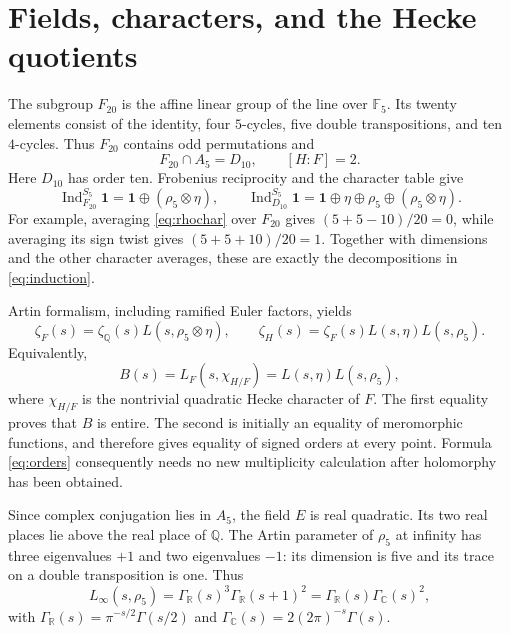 \documentclass[11pt]{article}
\theoremstyle{definition}
\theoremstyle{remark}
\newcommand{\Q}{\mathbb Q}
\newcommand{\R}{\mathbb R}
\newcommand{\C}{\mathbb C}
\newcommand{\Ind}{\operatorname{Ind}}
\newcommand{\Gr}{\Gamma_{\R}}
\newcommand{\Gc}{\Gamma_{\C}}
\newcommand{\one}{\mathbf 1}
\newcommand{\rh}{\rho_5}
\numberwithin{equation}{section}
\begin{document}
\section{Fields, characters, and the Hecke quotients}

The subgroup $F_{20}$ is the affine linear group of the line over $\mathbb F_5$. Its twenty elements consist of the identity, four $5$-cycles, five double transpositions, and ten $4$-cycles. Thus $F_{20}$ contains odd permutations and
\[
F_{20}\cap A_5=D_{10},\qquad [H:F]=2.
\]
Here $D_{10}$ has order ten. Frobenius reciprocity and the character table give
\begin{equation}\label{eq:induction}
\Ind_{F_{20}}^{S_5}\one=\one\oplus(\rh\otimes\eta),
\qquad
\Ind_{D_{10}}^{S_5}\one
=\one\oplus\eta\oplus\rh\oplus(\rh\otimes\eta).
\end{equation}
For example, averaging \eqref{eq:rhochar} over $F_{20}$ gives
$(5+5-10)/20=0$, while averaging its sign twist gives
$(5+5+10)/20=1$. Together with dimensions and the other character averages, these are exactly the decompositions in \eqref{eq:induction}.

Artin formalism, including ramified Euler factors, yields
\begin{equation}\label{eq:factorization}
\zeta_F(s)=\zeta_{\Q}(s)L(s,\rh\otimes\eta),\qquad
\zeta_H(s)=\zeta_F(s)L(s,\eta)L(s,\rh).
\end{equation}
Equivalently,
\begin{equation}\label{eq:B}
B(s)=L_F(s,\chi_{H/F})=L(s,\eta)L(s,\rh),
\end{equation}
where $\chi_{H/F}$ is the nontrivial quadratic Hecke character of $F$. The first equality proves that $B$ is entire. The second is initially an equality of meromorphic functions, and therefore gives equality of signed orders at every point. Formula \eqref{eq:orders} consequently needs no new multiplicity calculation after holomorphy has been obtained.

Since complex conjugation lies in $A_5$, the field $E$ is real quadratic. Its two real places lie above the real place of $\Q$. The Artin parameter of $\rh$ at infinity has three eigenvalues $+1$ and two eigenvalues $-1$: its dimension is five and its trace on a double transposition is one. Thus
\begin{equation}\label{eq:gamma}
L_\infty(s,\rh)=\Gr(s)^3\Gr(s+1)^2
=\Gr(s)\Gc(s)^2,
\end{equation}
with $\Gr(s)=\pi^{-s/2}\Gamma(s/2)$ and
$\Gc(s)=2(2\pi)^{-s}\Gamma(s)$.
\end{document}

